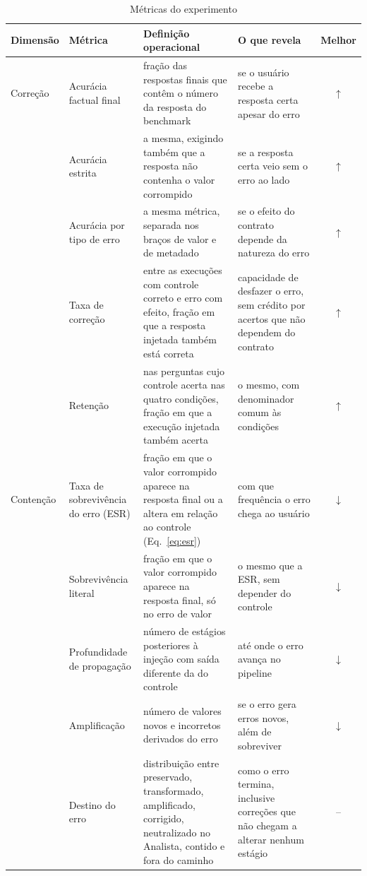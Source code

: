 \begin{table}[t]
\caption{Métricas do experimento}
\label{tab:metricas}
\centering
\footnotesize
\setlength{\tabcolsep}{4pt}
\begin{tabular}{|l|>{\raggedright\arraybackslash}p{3.0cm}|>{\raggedright\arraybackslash}p{6.0cm}|>{\raggedright\arraybackslash}p{4.9cm}|c|}
\hline
\textbf{Dimensão} & \textbf{Métrica} & \textbf{Definição operacional} & \textbf{O que revela} & \textbf{Melhor} \\
\hline
Correção & Acurácia factual final & fração das respostas finais que contêm o número da resposta do benchmark & se o usuário recebe a resposta certa apesar do erro & $\uparrow$ \\
 & Acurácia estrita & a mesma, exigindo também que a resposta não contenha o valor corrompido & se a resposta certa veio sem o erro ao lado & $\uparrow$ \\
 & Acurácia por tipo de erro & a mesma métrica, separada nos braços de valor e de metadado & se o efeito do contrato depende da natureza do erro & $\uparrow$ \\
 & Taxa de correção & entre as execuções com controle correto e erro com efeito, fração em que a resposta injetada também está correta & capacidade de desfazer o erro, sem crédito por acertos que não dependem do contrato & $\uparrow$ \\
 & Retenção & nas perguntas cujo controle acerta nas quatro condições, fração em que a execução injetada também acerta & o mesmo, com denominador comum às condições & $\uparrow$ \\
\hline
Contenção & Taxa de sobrevivência do erro (ESR) & fração em que o valor corrompido aparece na resposta final ou a altera em relação ao controle (Eq.~\ref{eq:esr}) & com que frequência o erro chega ao usuário & $\downarrow$ \\
 & Sobrevivência literal & fração em que o valor corrompido aparece na resposta final, só no erro de valor & o mesmo que a ESR, sem depender do controle & $\downarrow$ \\
 & Profundidade de propagação & número de estágios posteriores à injeção com saída diferente da do controle & até onde o erro avança no pipeline & $\downarrow$ \\
 & Amplificação & número de valores novos e incorretos derivados do erro & se o erro gera erros novos, além de sobreviver & $\downarrow$ \\
 & Destino do erro & distribuição entre preservado, transformado, amplificado, corrigido, neutralizado no Analista, contido e fora do caminho & como o erro termina, inclusive correções que não chegam a alterar nenhum estágio & -- \\

\end{tabular}
\end{table}
